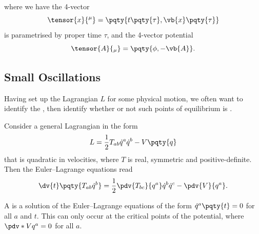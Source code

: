\begin{remarks}
\begin{enumerate}
\begin{equation}
        \end{equation}
        where we have the 4-vector 
        \begin{equation}
            \tensor{x}{^\mu} = \pqty{t\pqty{\tau}, \vb{x}\pqty{\tau}}
        \end{equation}
        is parametrised by proper time \(\tau\), and the 4-vector potential
        \begin{equation}
            \tensor{A}{_\mu} = \pqty{\phi, -\vb{A}}.
        \end{equation}
    \end{enumerate}
\end{remarks}

\subsection{Small Oscillations}

Having set up the Lagrangian \(L\) for some physical motion, we often want to identify the , then identify whether or not such points of equilibrium is .

Consider a general Lagrangian in the form
\begin{equation}
    L = \frac{1}{2} T_{ab} \dot{q}^a \dot{q}^b - V\pqty{q}
\end{equation}
that is quadratic in velocities, where \(T\) is real, symmetric and positive-definite. Then the Euler--Lagrange equations read
\begin{equation}
    \dv{t} \pqty{T_{ab} \dot{q}^b} = \frac{1}{2} \pdv{T_{bc}}{q^a} \dot{q}^b \dot{q}^c - \pdv{V}{q^a}.
\end{equation}

A  is a solution of the Euler--Lagrange equations of the form \(\dot{q}^a \pqty{t} = 0\) for all \(a\) and \(t\). This can only occur at the critical points of the potential, where \(\pdv*{V}{q^a} = 0\) for all \(a\).

